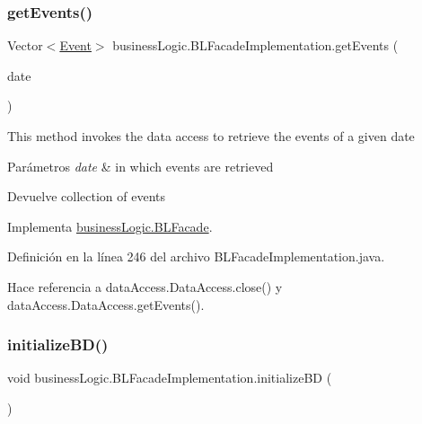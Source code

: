 \subsubsection{\texorpdfstring{getEvents()}{getEvents()}}
{\footnotesize\ttfamily Vector$<$\mbox{\hyperlink{classdomain_1_1Event}{Event}}$>$ business\+Logic.\+B\+L\+Facade\+Implementation.\+get\+Events (\begin{DoxyParamCaption}\item[{Date}]{date }\end{DoxyParamCaption})}

This method invokes the data access to retrieve the events of a given date


\begin{DoxyParams}{Parámetros}
{\em date} & in which events are retrieved \\
\hline
\end{DoxyParams}
\begin{DoxyReturn}{Devuelve}
collection of events 
\end{DoxyReturn}


Implementa \mbox{\hyperlink{interfacebusinessLogic_1_1BLFacade_a9db26f96faa50c91cb53fb831695c98f}{business\+Logic.\+B\+L\+Facade}}.



Definición en la línea 246 del archivo B\+L\+Facade\+Implementation.\+java.


\begin{DoxyCode}{0}

\end{DoxyCode}


Hace referencia a data\+Access.\+Data\+Access.\+close() y data\+Access.\+Data\+Access.\+get\+Events().

\mbox{\label{classbusinessLogic_1_1BLFacadeImplementation_a5f915c64121f2a6e37af4fc337e88ff0}} 
\subsubsection{\texorpdfstring{initializeBD()}{initializeBD()}}
{\footnotesize\ttfamily void business\+Logic.\+B\+L\+Facade\+Implementation.\+initialize\+BD (\begin{DoxyParamCaption}{ }\end{DoxyParamCaption})}


